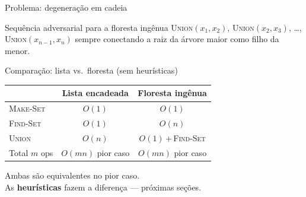 \documentclass[aspectratio=169]{beamer}
\begin{document}
\begin{frame}{Problema: degeneração em cadeia}%
  \begin{alertblock}{Sequência adversarial para a floresta ingênua}
    \textsc{Union}$(x_1,x_2)$, \textsc{Union}$(x_2,x_3)$, \ldots, \textsc{Union}$(x_{n-1},x_n)$
    sempre conectando a raiz da árvore maior como filho da menor.
  \end{alertblock}
  \vspace{0.3cm}
  \begin{center}
  \end{center}
\end{frame}

\begin{frame}{Comparação: lista vs.\ floresta (sem heurísticas)}%
  \begin{center}
  \renewcommand{\arraystretch}{1.5}
  \begin{tabular}{lcc}
    \toprule
    & \textbf{Lista encadeada} & \textbf{Floresta ingênua} \\
    \midrule
    \textsc{Make-Set} & $O(1)$ & $O(1)$ \\
    \textsc{Find-Set} & $O(1)$ & $O(n)$ \\
    \textsc{Union}    & $O(n)$ & $O(1)$\,+\,\textsc{Find-Set} \\
    Total $m$ ops    & $O(mn)$ pior caso & $O(mn)$ pior caso \\
    \bottomrule
  \end{tabular}
  \end{center}
  \vspace{0.3cm}
  \begin{center}
    Ambas são equivalentes no pior caso. \\
    As \textbf{heurísticas} fazem a diferença — próximas seções.
  \end{center}
\end{frame}
\end{document}
